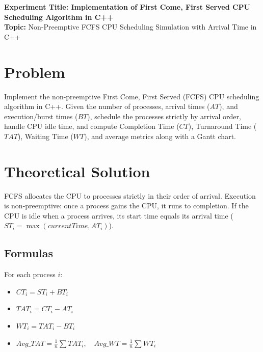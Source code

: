 \documentclass[10pt,a4paper]{article}
\begin{document}
\raggedbottom
\thispagestyle{firstpage}

\begin{center}
  {\Large\bfseries\sffamily\color{primary} Experiment Title: Implementation of First Come, First Served CPU Scheduling Algorithm in C++}\\[3pt]
  {\normalsize\sffamily\textbf{Topic:} Non-Preemptive FCFS CPU Scheduling Simulation with Arrival Time in C++}
\end{center}
\vspace{-4pt}

\section{Problem}
Implement the non-preemptive First Come, First Served (FCFS) CPU scheduling algorithm in C++. Given the number of processes, arrival times ($AT$), and execution/burst times ($BT$), schedule the processes strictly by arrival order, handle CPU idle time, and compute Completion Time ($CT$), Turnaround Time ($TAT$), Waiting Time ($WT$), and average metrics along with a Gantt chart.

\section{Theoretical Solution}
FCFS allocates the CPU to processes strictly in their order of arrival. Execution is non-preemptive: once a process gains the CPU, it runs to completion. If the CPU is idle when a process arrives, its start time equals its arrival time ($ST_i = \max(currentTime, AT_i)$).

\subsection{Formulas}
For each process $i$:
\begin{itemize}[noitemsep,topsep=1pt,leftmargin=1.2em]
  \item $CT_i = ST_i + BT_i$
  \item $TAT_i = CT_i - AT_i$
  \item $WT_i = TAT_i - BT_i$
  \item $Avg\_TAT = \frac{1}{n} \sum TAT_i, \quad Avg\_WT = \frac{1}{n} \sum WT_i$
\end{itemize}
\end{document}

